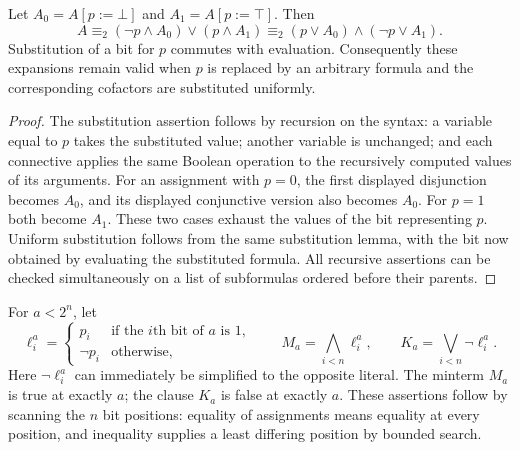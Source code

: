 \begin{theorem}\label{ca-shannon}
Let $A_0=A[p:=\bot]$ and $A_1=A[p:=\top]$.  Then
\[
 A\equiv_2(\neg p\wedge A_0)\vee(p\wedge A_1)
 \equiv_2(p\vee A_0)\wedge(\neg p\vee A_1).
\]
Substitution of a bit for $p$ commutes with evaluation.  Consequently these
expansions remain valid when $p$ is replaced by an arbitrary formula and
the corresponding cofactors are substituted uniformly.
\end{theorem}
\begin{proof}
The substitution assertion follows by recursion on the syntax: a variable
equal to $p$ takes the substituted value; another variable is unchanged; and
each connective applies the same Boolean operation to the recursively
computed values of its arguments.  For an assignment with $p=0$, the first
displayed disjunction becomes $A_0$, and its displayed conjunctive version
also becomes $A_0$.  For $p=1$ both become $A_1$.  These two cases exhaust the
values of the bit representing $p$.  Uniform substitution follows from the
same substitution lemma, with the bit now obtained by evaluating the
substituted formula.  All recursive assertions can be checked simultaneously
on a list of subformulas ordered before their parents.
\end{proof}

For $a<2^n$, let
\[
 \ell_i^a=\begin{cases}p_i&\text{if the $i$th bit of $a$ is $1$},\\
                        \neg p_i&\text{otherwise},\end{cases}
 \qquad M_a=\bigwedge_{i<n}\ell_i^a,
 \qquad K_a=\bigvee_{i<n}\neg\ell_i^a.
\]
Here $\neg\ell_i^a$ can immediately be simplified to the opposite literal.
The minterm $M_a$ is true at exactly $a$; the clause $K_a$ is false at exactly
$a$.  These assertions follow by scanning the $n$ bit positions: equality
of assignments means equality at every position, and inequality supplies a
least differing position by bounded search.

